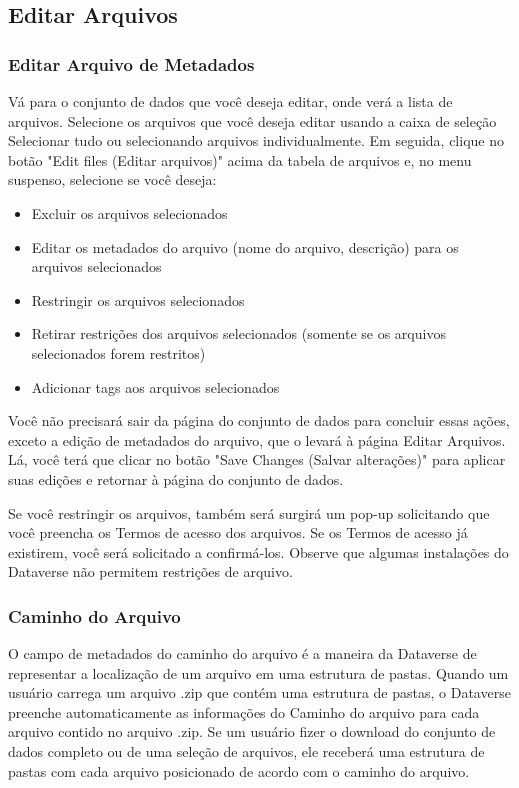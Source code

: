 \documentclass[12pt,hidelinks]{article}
\begin{document}
    \subsection{Editar Arquivos}

        \subsubsection{Editar Arquivo de Metadados}
        
\qquad Vá para o conjunto de dados que você deseja editar, onde verá a lista de arquivos. Selecione os arquivos que você deseja editar usando a caixa de seleção Selecionar tudo ou selecionando arquivos individualmente. Em seguida, clique no botão "Edit files (Editar arquivos)" acima da tabela de arquivos e, no menu suspenso, selecione se você deseja:

\begin{itemize}

    \item Excluir os arquivos selecionados
    \item Editar os metadados do arquivo (nome do arquivo, descrição) para os arquivos selecionados
    \item Restringir os arquivos selecionados
    \item Retirar restrições dos arquivos selecionados (somente se os arquivos selecionados forem restritos)
    \item Adicionar tags aos arquivos selecionados

\end{itemize}

Você não precisará sair da página do conjunto de dados para concluir essas ações, exceto a edição de metadados do arquivo, que o levará à página Editar Arquivos. Lá, você terá que clicar no botão "Save Changes (Salvar alterações)" para aplicar suas edições e retornar à página do conjunto de dados.

Se você restringir os arquivos, também será surgirá um pop-up solicitando que você preencha os Termos de acesso dos arquivos. Se os Termos de acesso já existirem, você será solicitado a confirmá-los. Observe que algumas instalações do Dataverse não permitem restrições de arquivo.
        
        \subsubsection{Caminho do Arquivo}
        
\qquad O campo de metadados do caminho do arquivo é a maneira da Dataverse de representar a localização de um arquivo em uma estrutura de pastas. Quando um usuário carrega um arquivo .zip que contém uma estrutura de pastas, o Dataverse preenche automaticamente as informações do Caminho do arquivo para cada arquivo contido no arquivo .zip. Se um usuário fizer o download do conjunto de dados completo ou de uma seleção de arquivos, ele receberá uma estrutura de pastas com cada arquivo posicionado de acordo com o caminho do arquivo.
\end{document}

